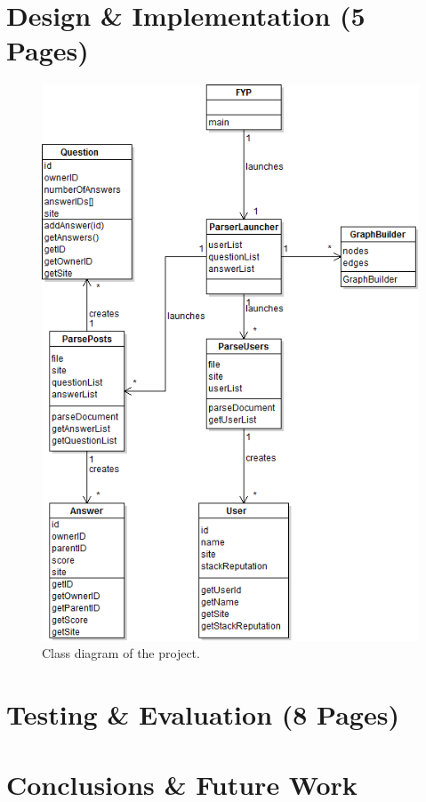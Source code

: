 \documentclass[]{final_report}
\begin{document}
\chapter{Design \& Implementation (5 Pages)}

\begin{figure}[ht!]
\centering
\includegraphics[width=140mm]{classdiagram2.png}
\caption{Class diagram of the project.}
\end{figure}

\chapter{Testing \& Evaluation (8 Pages)}

\chapter{Conclusions \& Future Work}
\end{document}
